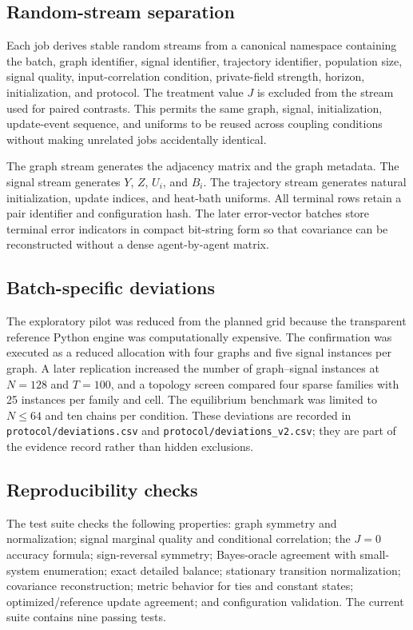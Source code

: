 \documentclass[11pt,a4paper]{article}
\begin{document}
\subsection{Random-stream separation}

Each job derives stable random streams from a canonical namespace containing the batch, graph identifier, signal identifier, trajectory identifier, population size, signal quality, input-correlation condition, private-field strength, horizon, initialization, and protocol. The treatment value $J$ is excluded from the stream used for paired contrasts. This permits the same graph, signal, initialization, update-event sequence, and uniforms to be reused across coupling conditions without making unrelated jobs accidentally identical.

The graph stream generates the adjacency matrix and the graph metadata. The signal stream generates $Y$, $Z$, $U_i$, and $B_i$. The trajectory stream generates natural initialization, update indices, and heat-bath uniforms. All terminal rows retain a pair identifier and configuration hash. The later error-vector batches store terminal error indicators in compact bit-string form so that covariance can be reconstructed without a dense agent-by-agent matrix.

\subsection{Batch-specific deviations}

The exploratory pilot was reduced from the planned grid because the transparent reference Python engine was computationally expensive. The confirmation was executed as a reduced allocation with four graphs and five signal instances per graph. A later replication increased the number of graph--signal instances at $N=128$ and $T=100$, and a topology screen compared four sparse families with 25 instances per family and cell. The equilibrium benchmark was limited to $N\le64$ and ten chains per condition. These deviations are recorded in \texttt{protocol/deviations.csv} and \texttt{protocol/deviations\_v2.csv}; they are part of the evidence record rather than hidden exclusions.

\subsection{Reproducibility checks}

The test suite checks the following properties: graph symmetry and normalization; signal marginal quality and conditional correlation; the $J=0$ accuracy formula; sign-reversal symmetry; Bayes-oracle agreement with small-system enumeration; exact detailed balance; stationary transition normalization; covariance reconstruction; metric behavior for ties and constant states; optimized/reference update agreement; and configuration validation. The current suite contains nine passing tests.
\end{document}
